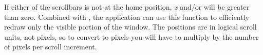 



If either of the scrollbars is not at the home position, {\it x} and/or
 will be greater than zero.  Combined with ,
the application can use this function to efficiently redraw only the
visible portion of the window.  The positions are in logical scroll
units, not pixels, so to convert to pixels you will have to multiply
by the number of pixels per scroll increment.




